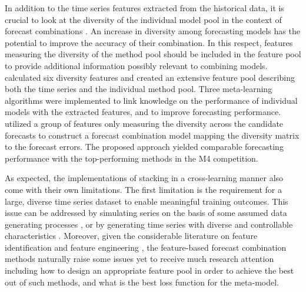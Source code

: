 \documentclass[a4paper,11pt]{article}
\newcommand{\pkg}[1]{{\normalfont\fontseries{b}\selectfont #1}}
\let\proglang=\textsf
\begin{document}
In addition to the time series features extracted from the historical data, it is crucial to look at the diversity of the individual model pool in the context of forecast combinations \citep{Batchelor1995-ps,Thomson2019-al,Atiya2020-ge,Lichtendahl2020-ut}. An increase in diversity among forecasting models has the potential to improve the accuracy of their combination. In this respect, features measuring the diversity of the method pool should be included in the feature pool to provide additional information possibly relevant to combining models. \citet{Lemke2010-wn} calculated six diversity features and created an extensive feature pool describing both the time series and the individual method pool. Three meta-learning algorithms were implemented to link knowledge on the performance of individual models with the extracted features, and to improve forecasting performance. \citet{Kang2021-ol} utilized a group of features only measuring the diversity across the candidate forecasts to construct a forecast combination model mapping the diversity matrix to the forecast errors. The proposed approach yielded comparable forecasting performance with the top-performing methods in the M4 competition.

As expected, the implementations of stacking in a cross-learning manner also come with their own limitations. The first limitation is the requirement for a large, diverse time series dataset to enable meaningful training outcomes. This issue can be addressed by simulating series on the basis of some assumed data generating processes \citep{talagala2018meta} \citep[implemented using the \proglang{R} package \pkg{forecast},][]{rforecast}, or by generating time series with diverse and controllable characteristics \citep{Kang2020-rl} \citep[implemented in the \proglang{R} package \pkg{gratis},][]{rgratis}. Moreover, given the considerable literature on feature identification and feature engineering \citep[e.g.,][]{Wang2009-hs,Kang2017-wt,Lemke2010-wn,Montero-Manso2020-tq,Li2020-od}, the feature-based forecast combination methods naturally raise some issues yet to receive much research attention including how to design an appropriate feature pool in order to achieve the best out of such methods, and what is the best loss function for the meta-model.
\end{document}
